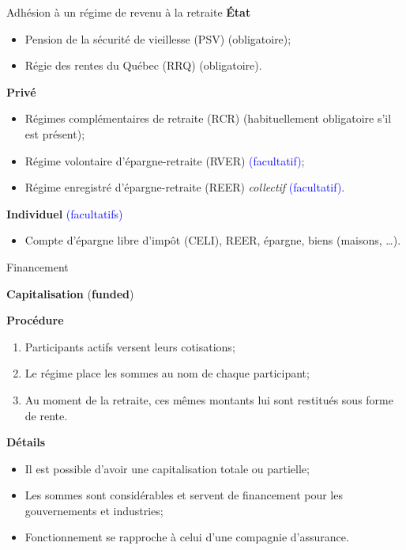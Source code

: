 \documentclass[10pt, french]{article}
\begin{document}
\begin{multicols*}{3}
\begin{conceptgen}{Adhésion à un régime de revenu à la retraite}
\textbf{État}
\begin{itemize}[leftmargin = *]
	\item	Pension de la sécurité de vieillesse (PSV) \textcolor{brickred}{(obligatoire)};
	\item	Régie des rentes du Québec (RRQ) \textcolor{brickred}{(obligatoire)}.
\end{itemize}
\textbf{Privé}
\begin{itemize}[leftmargin = *]
	\item	Régimes complémentaires de retraite (RCR) \textcolor{brickred}{(habituellement obligatoire s'il est présent)};
	\item	Régime volontaire d'épargne-retraite (RVER) \textcolor{blue}{(facultatif)};
	\item	Régime enregistré d'épargne-retraite (REER) \textit{collectif} \textcolor{blue}{(facultatif)}.
\end{itemize}
\textbf{Individuel} \textcolor{blue}{(facultatifs)}
\begin{itemize}[leftmargin = *]
	\item	Compte d'épargne libre d'impôt (CELI), REER, épargne, biens (maisons, \dots).
\end{itemize}
\end{conceptgen}

\begin{conceptgen}{Financement}
\begin{center}
\textbf{Capitalisation} (\textbf{funded})
\end{center}

\textbf{Procédure}
\begin{enumerate}[leftmargin = *]
	\item	Participants actifs versent leurs cotisations;
	\item	Le régime place les sommes au nom de chaque participant;
	\item	Au moment de la retraite, ces mêmes montants lui sont restitués sous forme de rente.
\end{enumerate}

\textbf{Détails}
\begin{itemize}[leftmargin = *]
	\item	Il est possible d'avoir une capitalisation totale ou partielle;
	\item	Les sommes sont considérables et servent de financement pour les gouvernements et industries;
	\item	Fonctionnement se rapproche à celui d'une compagnie d'assurance.
\end{itemize}


\end{conceptgen}
\end{multicols*}
\end{document}
